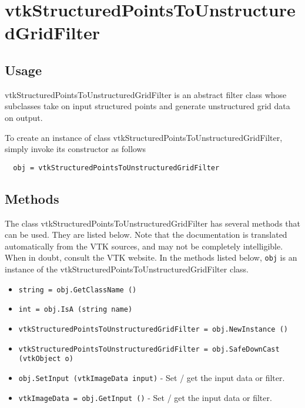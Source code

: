 \section{vtkStructuredPointsToUnstructuredGridFilter}

\subsection{Usage}

 vtkStructuredPointsToUnstructuredGridFilter is an abstract filter class 
 whose subclasses take on input structured points and generate unstructured
 grid data on output.

To create an instance of class vtkStructuredPointsToUnstructuredGridFilter, simply
invoke its constructor as follows
\begin{verbatim}
  obj = vtkStructuredPointsToUnstructuredGridFilter
\end{verbatim}
\subsection{Methods}

The class vtkStructuredPointsToUnstructuredGridFilter has several methods that can be used.
  They are listed below.
Note that the documentation is translated automatically from the VTK sources,
and may not be completely intelligible.  When in doubt, consult the VTK website.
In the methods listed below, \verb|obj| is an instance of the vtkStructuredPointsToUnstructuredGridFilter class.
\begin{itemize}
\item  \verb|string = obj.GetClassName ()|

\item  \verb|int = obj.IsA (string name)|

\item  \verb|vtkStructuredPointsToUnstructuredGridFilter = obj.NewInstance ()|

\item  \verb|vtkStructuredPointsToUnstructuredGridFilter = obj.SafeDownCast (vtkObject o)|

\item  \verb|obj.SetInput (vtkImageData input)| -  Set / get the input data or filter.

\item  \verb|vtkImageData = obj.GetInput ()| -  Set / get the input data or filter.

\end{itemize}
